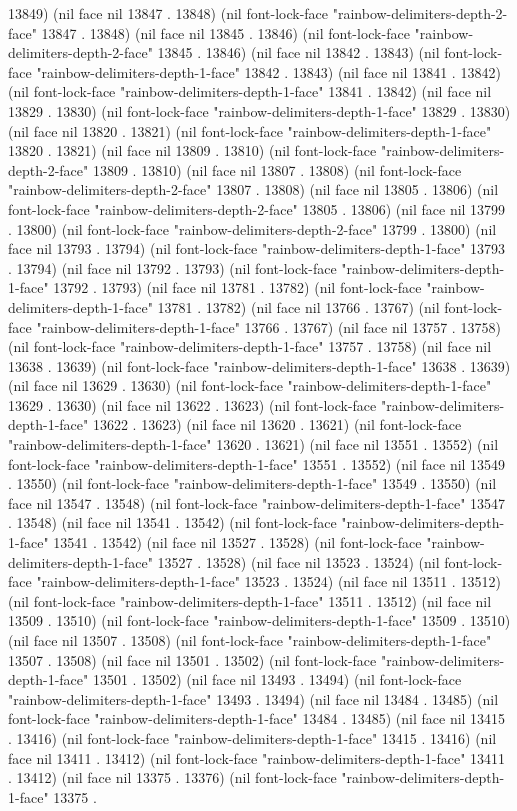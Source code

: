 13849) (nil face nil 13847 . 13848) (nil font-lock-face "rainbow-delimiters-depth-2-face" 13847 . 13848) (nil face nil 13845 . 13846) (nil font-lock-face "rainbow-delimiters-depth-2-face" 13845 . 13846) (nil face nil 13842 . 13843) (nil font-lock-face "rainbow-delimiters-depth-1-face" 13842 . 13843) (nil face nil 13841 . 13842) (nil font-lock-face "rainbow-delimiters-depth-1-face" 13841 . 13842) (nil face nil 13829 . 13830) (nil font-lock-face "rainbow-delimiters-depth-1-face" 13829 . 13830) (nil face nil 13820 . 13821) (nil font-lock-face "rainbow-delimiters-depth-1-face" 13820 . 13821) (nil face nil 13809 . 13810) (nil font-lock-face "rainbow-delimiters-depth-2-face" 13809 . 13810) (nil face nil 13807 . 13808) (nil font-lock-face "rainbow-delimiters-depth-2-face" 13807 . 13808) (nil face nil 13805 . 13806) (nil font-lock-face "rainbow-delimiters-depth-2-face" 13805 . 13806) (nil face nil 13799 . 13800) (nil font-lock-face "rainbow-delimiters-depth-2-face" 13799 . 13800) (nil face nil 13793 . 13794) (nil font-lock-face "rainbow-delimiters-depth-1-face" 13793 . 13794) (nil face nil 13792 . 13793) (nil font-lock-face "rainbow-delimiters-depth-1-face" 13792 . 13793) (nil face nil 13781 . 13782) (nil font-lock-face "rainbow-delimiters-depth-1-face" 13781 . 13782) (nil face nil 13766 . 13767) (nil font-lock-face "rainbow-delimiters-depth-1-face" 13766 . 13767) (nil face nil 13757 . 13758) (nil font-lock-face "rainbow-delimiters-depth-1-face" 13757 . 13758) (nil face nil 13638 . 13639) (nil font-lock-face "rainbow-delimiters-depth-1-face" 13638 . 13639) (nil face nil 13629 . 13630) (nil font-lock-face "rainbow-delimiters-depth-1-face" 13629 . 13630) (nil face nil 13622 . 13623) (nil font-lock-face "rainbow-delimiters-depth-1-face" 13622 . 13623) (nil face nil 13620 . 13621) (nil font-lock-face "rainbow-delimiters-depth-1-face" 13620 . 13621) (nil face nil 13551 . 13552) (nil font-lock-face "rainbow-delimiters-depth-1-face" 13551 . 13552) (nil face nil 13549 . 13550) (nil font-lock-face "rainbow-delimiters-depth-1-face" 13549 . 13550) (nil face nil 13547 . 13548) (nil font-lock-face "rainbow-delimiters-depth-1-face" 13547 . 13548) (nil face nil 13541 . 13542) (nil font-lock-face "rainbow-delimiters-depth-1-face" 13541 . 13542) (nil face nil 13527 . 13528) (nil font-lock-face "rainbow-delimiters-depth-1-face" 13527 . 13528) (nil face nil 13523 . 13524) (nil font-lock-face "rainbow-delimiters-depth-1-face" 13523 . 13524) (nil face nil 13511 . 13512) (nil font-lock-face "rainbow-delimiters-depth-1-face" 13511 . 13512) (nil face nil 13509 . 13510) (nil font-lock-face "rainbow-delimiters-depth-1-face" 13509 . 13510) (nil face nil 13507 . 13508) (nil font-lock-face "rainbow-delimiters-depth-1-face" 13507 . 13508) (nil face nil 13501 . 13502) (nil font-lock-face "rainbow-delimiters-depth-1-face" 13501 . 13502) (nil face nil 13493 . 13494) (nil font-lock-face "rainbow-delimiters-depth-1-face" 13493 . 13494) (nil face nil 13484 . 13485) (nil font-lock-face "rainbow-delimiters-depth-1-face" 13484 . 13485) (nil face nil 13415 . 13416) (nil font-lock-face "rainbow-delimiters-depth-1-face" 13415 . 13416) (nil face nil 13411 . 13412) (nil font-lock-face "rainbow-delimiters-depth-1-face" 13411 . 13412) (nil face nil 13375 . 13376) (nil font-lock-face "rainbow-delimiters-depth-1-face" 13375 . 